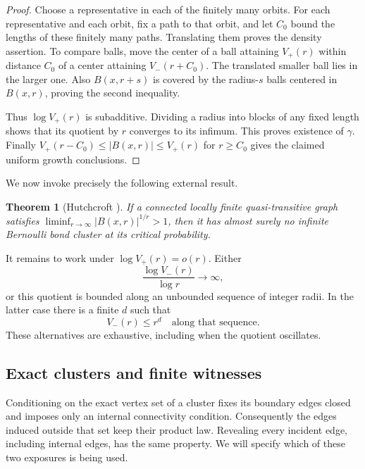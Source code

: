 \documentclass[11pt]{article}
\newtheorem{theorem}{Theorem}[section]
\theoremstyle{definition}
\begin{document}
\begin{proof}
Choose a representative in each of the finitely many orbits. For
each representative and each orbit, fix a path to that orbit, and
let $C_0$ bound the lengths of these finitely many paths. Translating
them proves the density assertion. To compare balls, move the center
of a ball attaining $V_+(r)$ within distance $C_0$ of a center attaining
$V_-(r+C_0)$. The translated smaller ball lies in the larger one.
Also $B(x,r+s)$ is covered by the radius-$s$ balls centered in
$B(x,r)$, proving the second inequality.

Thus $\log V_+(r)$ is subadditive. Dividing a radius into blocks of
any fixed length shows that its quotient by $r$ converges to its
infimum. This proves existence of $\gamma$. Finally
$V_+(r-C_0)\le |B(x,r)|\le V_+(r)$ for $r\ge C_0$ gives the claimed
uniform growth conclusions.
\end{proof}

We now invoke precisely the following external result.
\begin{theorem}[Hutchcroft {\cite[Theorem~1.2]{Hutchcroft2016}}]
\label{thm:exponential}
If a connected locally finite quasi-transitive graph satisfies
$\liminf_{r\to\infty}|B(x,r)|^{1/r}>1$, then it has almost surely no
infinite Bernoulli bond cluster at its critical probability.
\end{theorem}

It remains to work under $\log V_+(r)=o(r)$. Either
\begin{equation}
\label{eq:superpoly-growth}
 \frac{\log V_-(r)}{\log r}\longrightarrow\infty,
\end{equation}
or this quotient is bounded along an unbounded sequence of integer
radii. In the latter case there is a finite $d$ such that
\begin{equation}
\label{eq:polynomial-subsequence}
 V_-(r)\le r^d
 \quad\text{along that sequence.}
\end{equation}
These alternatives are exhaustive, including when the quotient
oscillates.

\subsection{Exact clusters and finite witnesses}

Conditioning on the exact vertex set of a cluster fixes its boundary
edges closed and imposes only an internal connectivity condition.
Consequently the edges induced outside that set keep their product
law. Revealing every incident edge, including internal edges,
has the same property. We will specify which of these two exposures
is being used.
\end{document}
